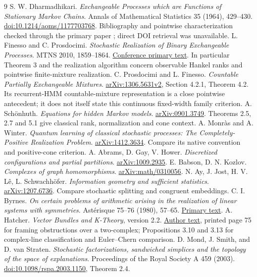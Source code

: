 \documentclass[11pt]{article}
\theoremstyle{remark}\newtheorem{remark}[theorem]{Remark}
\begin{document}
\begin{thebibliography}{9}
 S. W. Dharmadhikari. \emph{Exchangeable Processes which are Functions of Stationary Markov Chains}. Annals of Mathematical Statistics 35 (1964), 429--430. \href{https://doi.org/10.1214/aoms/1177703768}{doi:10.1214/aoms/1177703768}. Bibliography and pointwise characterization checked through the primary paper \cite{FP}; direct DOI retrieval was unavailable.
 L. Finesso and C. Prosdocimi. \emph{Stochastic Realization of Binary Exchangeable Processes}. MTNS 2010, 1859--1864. \href{https://www.conferences.hu/mtns2010/proceedings/Papers/330_039.pdf}{Conference primary text}. In particular Theorem 3 and the realization algorithm concern observable Hankel ranks and pointwise finite-mixture realization.
 C. Prosdocimi and L. Finesso. \emph{Countable Partially Exchangeable Mixtures}. \href{https://arxiv.org/html/1306.5631v2}{arXiv:1306.5631v2}, Section 4.2.1, Theorem 4.2. Its recurrent-HMM countable-mixture representation is a close pointwise antecedent; it does not itself state this continuous fixed-width family criterion.
 A. Sch\"onhuth. \emph{Equations for hidden Markov models}. \href{https://arxiv.org/abs/0901.3749}{arXiv:0901.3749}. Theorems 2.5, 2.7 and 5.1 give classical rank, normalization and cone context.
 A. Monr\`as and A. Winter. \emph{Quantum learning of classical stochastic processes: The Completely-Positive Realization Problem}. \href{https://arxiv.org/abs/1412.3634}{arXiv:1412.3634}. Compare its native convention and positive-cone criterion.
 A. Abrams, D. Gay, V. Hower. \emph{Discretized configurations and partial partitions}. \href{https://arxiv.org/abs/1009.2935}{arXiv:1009.2935}.
 E. Babson, D. N. Kozlov. \emph{Complexes of graph homomorphisms}. \href{https://arxiv.org/abs/math/0310056}{arXiv:math/0310056}.
 N. Ay, J. Jost, H. V. L\^e, L. Schwachh\"ofer. \emph{Information geometry and sufficient statistics}. \href{https://arxiv.org/abs/1207.6736}{arXiv:1207.6736}. Compare stochastic splitting and congruent embeddings.
 C. I. Byrnes. \emph{On certain problems of arithmetic arising in the realization of linear systems with symmetries}. Ast\'erisque 75--76 (1980), 57--65. \href{https://www.numdam.org/article/AST_1980__75-76__57_0.pdf}{Primary text}.
 A. Hatcher. \emph{Vector Bundles and K-Theory}, version 2.2. \href{https://pi.math.cornell.edu/~hatcher/VBKT/VB.pdf}{Author text}, printed page 75 for framing obstructions over a two-complex; Propositions 3.10 and 3.13 for complex-line classification and Euler--Chern comparison.
 D. Mond, J. Smith, and D. van Straten. \emph{Stochastic factorizations, sandwiched simplices and the topology of the space of explanations}. Proceedings of the Royal Society A 459 (2003). \href{https://doi.org/10.1098/rspa.2003.1150}{doi:10.1098/rspa.2003.1150}, Theorem 2.4.
\end{thebibliography}
\end{document}
